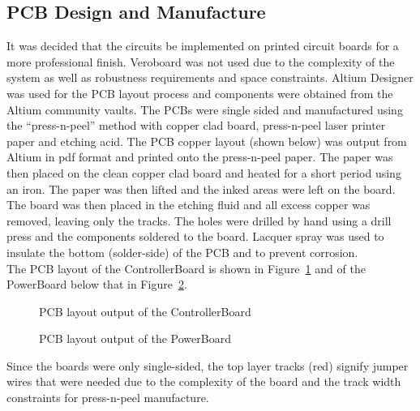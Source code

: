   \subsection{PCB Design and Manufacture}
  \label{sub:PCB Design and Manufacture}
    It was decided that the circuits be implemented on printed circuit boards for a more professional finish. Veroboard was not used due to the complexity of the system as well as robustness requirements and space constraints. Altium Designer was used for the PCB layout process and components were obtained from the Altium community vaults. The PCBs were single sided and manufactured using the ``press-n-peel'' method with copper clad board, press-n-peel laser printer paper and etching acid. The PCB copper layout (shown below) was output from Altium in pdf format and printed onto the press-n-peel paper. The paper was then placed on the clean copper clad board and heated for a short period using an iron. The paper was then lifted and the inked areas were left on the board. The board was then placed in the etching fluid and all excess copper was removed, leaving only the tracks. The holes were drilled by hand using a drill press and the components soldered to the board. Lacquer spray was used to insulate the bottom (solder-side) of the PCB and to prevent corrosion.\\

    The PCB layout of the ControllerBoard is shown in Figure~\ref{fig:ControllerBoardPCB} and of the PowerBoard below that in Figure~\ref{fig:PowerBoardPCBRev1}.

    \begin{figure}[H]
      \begin{center}
        \caption{PCB layout output of the ControllerBoard}
        \label{fig:ControllerBoardPCB}
      \end{center}
    \end{figure}

    \begin{figure}[H]
      \begin{center}
        \caption{PCB layout output of the PowerBoard}
        \label{fig:PowerBoardPCBRev1}
      \end{center}
    \end{figure}

    Since the boards were only single-sided, the top layer tracks (red) signify jumper wires that were needed due to the complexity of the board and the track width constraints for press-n-peel manufacture.\\

